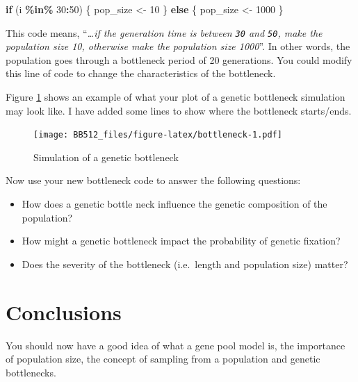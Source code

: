 \documentclass[
  a4paper]{book}
\newenvironment{Shaded}{\begin{snugshade}}{\end{snugshade}}
\newcommand{\ControlFlowTok}[1]{\textcolor[rgb]{0.13,0.29,0.53}{\textbf{#1}}}
\newcommand{\DecValTok}[1]{\textcolor[rgb]{0.00,0.00,0.81}{#1}}
\newcommand{\NormalTok}[1]{#1}
\newcommand{\OtherTok}[1]{\textcolor[rgb]{0.56,0.35,0.01}{#1}}
\newcommand{\SpecialCharTok}[1]{\textcolor[rgb]{0.81,0.36,0.00}{\textbf{#1}}}
\providecommand{\tightlist}{%
  \setlength{\itemsep}{0pt}\setlength{\parskip}{0pt}}
\begin{document}
\begin{Shaded}
\begin{Highlighting}[]
\ControlFlowTok{if}\NormalTok{ (i }\SpecialCharTok{\%in\%} \DecValTok{30}\SpecialCharTok{:}\DecValTok{50}\NormalTok{) \{}
\NormalTok{  pop\_size }\OtherTok{\textless{}{-}} \DecValTok{10}
\NormalTok{\} }\ControlFlowTok{else}\NormalTok{ \{}
\NormalTok{  pop\_size }\OtherTok{\textless{}{-}} \DecValTok{1000}
\NormalTok{\}}
\end{Highlighting}
\end{Shaded}

This code means, ``\emph{\ldots if the generation time is between \texttt{30} and \texttt{50}, make the population size 10, otherwise make the population size 1000}''. In other words, the population goes through a bottleneck period of 20 generations. You could modify this line of code to change the characteristics of the bottleneck.

Figure \ref{fig:bottleneck} shows an example of what your plot of a genetic bottleneck simulation may look like. I have added some lines to show where the bottleneck starts/ends.

\begin{figure}
\centering
\texttt{[image: BB512\_files/figure-latex/bottleneck-1.pdf]}
\caption{\label{fig:bottleneck}Simulation of a genetic bottleneck}
\end{figure}

Now use your new bottleneck code to answer the following questions:

\begin{itemize}
\tightlist
\item
  How does a genetic bottle neck influence the genetic composition of the population?
\item
  How might a genetic bottleneck impact the probability of genetic fixation?
\item
  Does the severity of the bottleneck (i.e.~length and population size) matter?
\end{itemize}

\hypertarget{conclusions}{%
\section{Conclusions}\label{conclusions}}

You should now have a good idea of what a gene pool model is, the importance of population size, the concept of sampling from a population and genetic bottlenecks.
\end{document}
